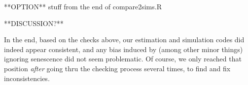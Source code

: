 {*}{*}OPTION{*}{*} stuff from the end of compare2sims.R

{*}{*}DISCUSSION?{*}{*}

In the end, based on the checks above, our estimation and simulation
codes did indeed appear consistent, and any bias induced by (among
other minor things) ignoring senescence did not seem problematic.
Of course, we only reached that position \emph{after} going thru the
checking process several times, to find and fix inconsistencies.
